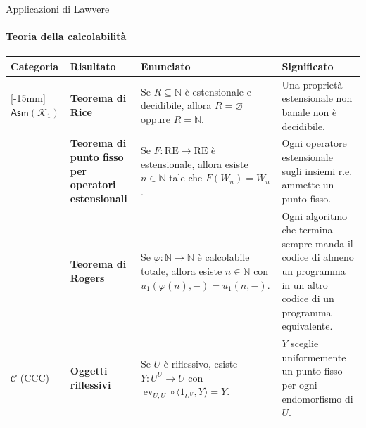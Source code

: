 \documentclass[italian,usepdftitle=false]{beamer}
\newcommand{\NN}{\mathbb{N}}
\newcommand{\RE}{\mathrm{RE}}
\DeclareMathOperator{\ev}{ev}
\begin{document}
\begin{frame}{Applicazioni di Lawvere}
  \framesubtitle{Teoria della calcolabilità}
  \scriptsize
  \renewcommand{\arraystretch}{1.30}
  \setlength{\tabcolsep}{4pt}
  \begin{tabularx}{\textwidth}{@{}>{\centering\arraybackslash}p{} >{\bfseries}L{.18\textwidth} Y L{.215\textwidth}@{}}
    \toprule
    \textcolor{maincolor}{\bfseries Categoria}
      & Risultato & Enunciato & Significato \\
    \midrule
    [-15mm]{\textcolor{maincolor}{$\mathsf{Asm}(\mathcal K_1)$}}
      & Teorema di Rice
      & Se $R\subseteq\NN$ è estensionale e decidibile, allora
        $R=\varnothing$ oppure $R=\NN$.
      & Una proprietà estensionale non banale non è decidibile. \\
    & Teorema di punto fisso per operatori estensionali
      & Se $F:\RE\to\RE$ è estensionale, allora esiste $n\in\NN$ tale che
        $F(W_n)=W_n$.
      & Ogni operatore estensionale sugli insiemi r.e. ammette un punto fisso. \\
    & Teorema di Rogers
      & Se $\varphi:\NN\to\NN$ è calcolabile totale, allora esiste $n\in\NN$
        con $u_1(\varphi(n),-)=u_1(n,-)$.
      & Ogni algoritmo che termina sempre manda il codice di almeno un programma in un altro codice di un programma equivalente. \\
    \addlinespace[.7mm]
    \textcolor{maincolor}{$\mathcal C$ (CCC)}
      & Oggetti riflessivi
      & Se $U$ è riflessivo, esiste $Y:U^U\to U$ con
        $\ev_{U,U}\circ\langle 1_{U^U},Y\rangle=Y$.
      & $Y$ sceglie uniformemente un punto fisso per ogni endomorfismo di $U$. \\
    \bottomrule
  \end{tabularx}
\end{frame}
\end{document}
